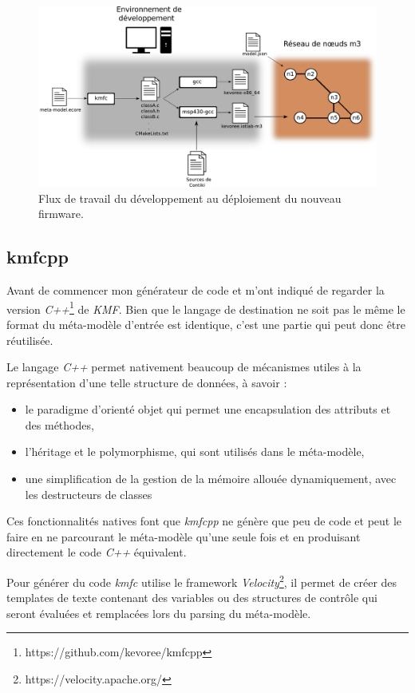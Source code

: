 \begin{figure}[ht!]
\centering
\includegraphics[scale=0.55]{images/workflow-schema/workflow.pdf}
\caption{Flux de travail du développement au déploiement du nouveau firmware.}
\label{workfow}
\end{figure}

\subsection{\label{kmfcpp}kmfcpp}

Avant de commencer mon générateur de code \johann et \paco m'ont indiqué de regarder la version \emph{C++}\footnote{https://github.com/kevoree/kmfcpp} de \emph{KMF}. Bien que le langage de destination ne soit pas le même le format du méta-modèle d'entrée est identique, c'est une partie qui peut donc être réutilisée.

Le langage \emph{C++} permet nativement beaucoup de mécanismes utiles à la représentation d'une telle structure de données, à savoir :

\begin{itemize}
\item le paradigme d'orienté objet qui permet une encapsulation des attributs et des méthodes,
\item l'héritage et le polymorphisme, qui sont utilisés dans le méta-modèle,
\item une simplification de la gestion de la mémoire allouée dynamiquement, avec les destructeurs de classes
\end{itemize}

Ces fonctionnalités natives font que \emph{kmfcpp} ne génère que peu de code et peut le faire en ne parcourant le méta-modèle qu'une seule fois et en produisant directement le code \emph{C++} équivalent.

Pour générer du code \emph{kmfc} utilise le framework \emph{Velocity}\footnote{https://velocity.apache.org/}, il permet de créer des templates de texte contenant des variables ou des structures de contrôle qui seront évaluées et remplacées lors du parsing du méta-modèle.

